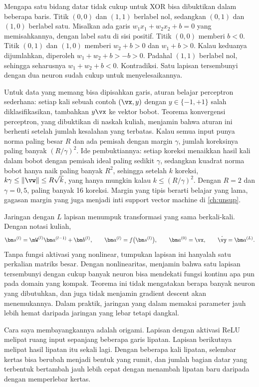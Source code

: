 Mengapa satu bidang datar tidak cukup untuk XOR bisa dibuktikan dalam beberapa baris. Titik
$(0,0)$ dan $(1,1)$ berlabel nol, sedangkan $(0,1)$ dan $(1,0)$ berlabel satu. Misalkan ada garis
$w_1x_1+w_2x_2+b=0$ yang memisahkannya, dengan label satu di sisi positif. Titik $(0,0)$ memberi
$b<0$. Titik $(0,1)$ dan $(1,0)$ memberi $w_2+b>0$ dan $w_1+b>0$. Kalau keduanya dijumlahkan,
diperoleh $w_1+w_2+b>-b>0$. Padahal $(1,1)$ berlabel nol, sehingga seharusnya $w_1+w_2+b<0$.
Kontradiksi. Satu lapisan tersembunyi dengan dua neuron sudah cukup untuk menyelesaikannya.

Untuk data yang memang bisa dipisahkan garis, aturan belajar perceptron \citep{rosenblatt1958} sederhana: setiap kali sebuah
contoh $(\vx,y)$ dengan $y\in\{-1,+1\}$ salah diklasifikasikan, tambahkan $y\vx$ ke vektor bobot. Teorema konvergensi perceptron, yang
dibuktikan di naskah kuliah, menjamin bahwa aturan ini berhenti setelah jumlah kesalahan yang terbatas. Kalau semua input punya norma
paling besar $R$ dan ada pemisah dengan margin $\gamma$, jumlah koreksinya paling banyak $(R/\gamma)^2$. Ide pembuktiannya: setiap
koreksi menaikkan hasil kali dalam bobot dengan pemisah ideal paling sedikit $\gamma$, sedangkan kuadrat norma bobot hanya naik paling
banyak $R^2$, sehingga setelah $k$ koreksi, $k\gamma\le\|\vw\|\le R\sqrt k$, yang hanya mungkin kalau $k\le(R/\gamma)^2$. Dengan $R=2$ dan
$\gamma=0{,}5$, paling banyak 16 koreksi. Margin yang tipis berarti belajar yang lama, gagasan margin yang juga menjadi inti support vector
machine di \cref{ch:unsup}.

Jaringan  dengan $L$ lapisan menumpuk transformasi yang sama berkali-kali.
Dengan notasi kuliah,
\begin{equation}
\bm s^{(l)}=\mW^{(l)}\bm a^{(l-1)}+\bm b^{(l)},\qquad \bm a^{(l)}=f\big(\bm s^{(l)}\big),
\qquad \bm a^{(0)}=\vx,\qquad \hat{\vy}=\bm a^{(L)}.
\end{equation}
Tanpa fungsi aktivasi yang nonlinear, tumpukan lapisan ini hanyalah satu perkalian matriks
besar. Dengan nonlinearitas,  \citep{cybenko1989,hornik1989}
menjamin bahwa satu lapisan tersembunyi dengan cukup banyak neuron bisa mendekati fungsi kontinu
apa pun pada domain yang kompak. Teorema ini tidak mengatakan berapa banyak neuron yang
dibutuhkan, dan juga tidak menjamin gradient descent akan menemukannya. Dalam praktik, jaringan
yang dalam memakai parameter jauh lebih hemat daripada jaringan yang lebar tetapi dangkal.

Cara saya membayangkannya adalah origami. Lapisan dengan aktivasi ReLU melipat ruang input
sepanjang beberapa garis lipatan. Lapisan berikutnya melipat hasil lipatan itu sekali lagi.
Dengan beberapa kali lipatan, selembar kertas bisa berubah menjadi bentuk yang rumit, dan
jumlah bagian datar yang terbentuk bertambah jauh lebih cepat dengan menambah lipatan baru
daripada dengan memperlebar kertas.

